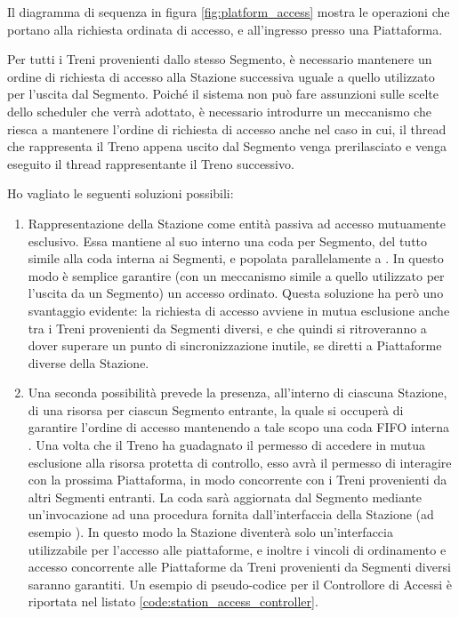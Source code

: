 		Il diagramma di sequenza in figura \ref{fig:platform_access} mostra le operazioni che portano alla richiesta ordinata di accesso, e all'ingresso presso una Piattaforma.
		\begin{description}
			\item{}
		
		Per tutti i Treni provenienti dallo stesso Segmento, è necessario mantenere un ordine di richiesta di accesso alla Stazione successiva uguale a quello utilizzato per l'uscita dal Segmento. Poiché il sistema non può fare assunzioni sulle scelte dello scheduler che verrà adottato, è necessario introdurre un meccanismo che riesca a mantenere l'ordine di richiesta di accesso anche nel caso in cui, il thread che rappresenta il Treno appena uscito dal Segmento venga prerilasciato e venga eseguito il thread rappresentante il Treno successivo.

		Ho vagliato le seguenti soluzioni possibili:
		\begin{enumerate}
			\item Rappresentazione della Stazione come entità passiva ad accesso mutuamente esclusivo. Essa mantiene al suo interno una coda per Segmento, del tutto simile alla coda  interna ai Segmenti, e popolata parallelamente a . In questo modo è semplice garantire (con un meccanismo simile a quello utilizzato per l'uscita da un Segmento) un accesso ordinato. Questa soluzione ha però uno svantaggio evidente: la richiesta di accesso avviene in mutua esclusione anche tra i Treni provenienti da Segmenti diversi, e che quindi si ritroveranno a dover superare un punto di sincronizzazione inutile, se diretti a Piattaforme diverse della Stazione.
			
			\item Una seconda possibilità prevede la presenza, all'interno di ciascuna Stazione, di una risorsa   per ciascun Segmento entrante, la quale si occuperà di garantire l'ordine di accesso mantenendo a tale scopo una coda FIFO interna . Una volta che il Treno ha guadagnato il permesso di accedere in mutua esclusione alla risorsa protetta di controllo, esso avrà il permesso di interagire con la prossima Piattaforma, in modo concorrente con i Treni provenienti da altri Segmenti entranti. La coda  sarà aggiornata dal Segmento mediante un'invocazione ad una procedura fornita dall'interfaccia della Stazione (ad esempio ).
			In questo modo la Stazione diventerà solo un'interfaccia utilizzabile per l'accesso alle piattaforme, e inoltre i vincoli di ordinamento e accesso concorrente alle Piattaforme da Treni provenienti da Segmenti diversi saranno garantiti.
			Un esempio di pseudo-codice per il Controllore di Accessi è riportata nel listato \ref{code:station_access_controller}.
			

\end{enumerate}
\end{description}
